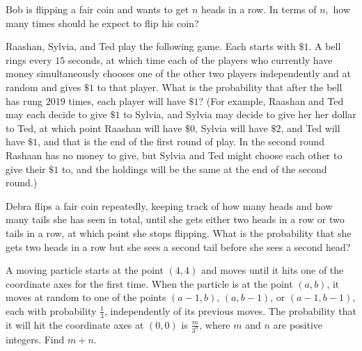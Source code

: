 \documentclass{article}
\begin{document}
\begin{req}[]{3}
Bob is flipping a fair coin and wants to get $n$ heads in a row. In terms of $n,$ how many times should he expect to flip his coin?
\end{req}

\begin{prob}[AMC 12B 2019/19]{3}
 Raashan, Sylvia, and Ted play the following game. Each starts with $\$ 1$. A bell rings every $15$ seconds, at which time each of the players who currently have money simultaneously chooses one of the other two players independently and at random and gives $\$1$ to that player. What is the probability that after the bell has rung $2019$ times, each player will have $\$1$? (For example, Raashan and Ted may each decide to give $\$1$ to Sylvia, and Sylvia may decide to give her her dollar to Ted, at which point Raashan will have $\$0$, Sylvia will have $\$2$, and Ted will have $\$1$, and that is the end of the first round of play. In the second round Rashaan has no money to give, but Sylvia and Ted might choose each other to give their $\$1$ to, and the holdings will be the same at the end of the second round.)
\end{prob}

\begin{prob}[AMC 10B 2019/21]{3}
Debra flips a fair coin repeatedly, keeping track of how many heads and how many tails she has seen in total, until she gets either two heads in a row or two tails in a row, at which point she stops flipping. What is the probability that she gets two heads in a row but she sees a second tail before she sees a second head?
\end{prob}

\begin{prob}[AIME I 2019/5]{3}
A moving particle starts at the point $(4,4)$ and moves until it hits one of the coordinate axes for the first time. When the particle is at the point $(a,b)$, it moves at random to one of the points $(a-1,b)$, $(a,b-1)$, or $(a-1,b-1)$, each with probability $\tfrac{1}{3}$, independently of its previous moves. The probability that it will hit the coordinate axes at $(0,0)$ is $\tfrac{m}{3^n}$, where $m$ and $n$ are positive integers. Find $m + n$.
\end{prob}

\end{document}
